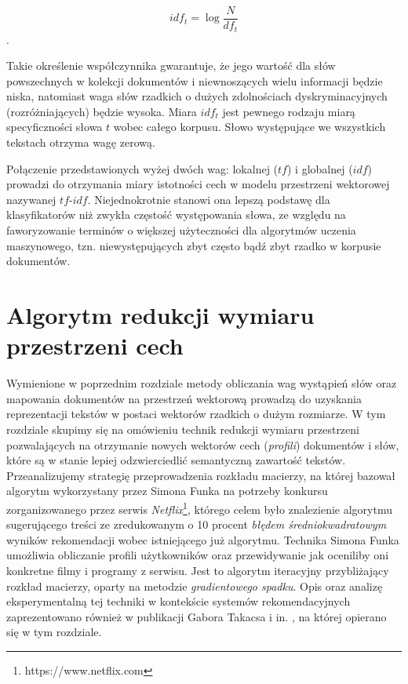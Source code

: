 \documentclass{pracamgr}
\begin{document}
\[ 
idf_t = \log\frac{N}{df_t}
\].

Takie określenie współczynnika gwarantuje, że jego wartość dla słów powszechnych w kolekcji dokumentów i niewnoszących wielu informacji będzie niska, natomiast waga słów rzadkich o dużych zdolnościach dyskryminacyjnych (rozróżniających) będzie wysoka. Miara $idf_t$ jest pewnego rodzaju miarą specyficzności słowa $t$ wobec całego korpusu. Słowo występujące we wszystkich tekstach otrzyma wagę zerową. 

Połączenie przedstawionych wyżej dwóch wag: lokalnej ($tf$) i globalnej ($idf$) prowadzi do otrzymania miary istotności cech w modelu przestrzeni wektorowej nazywanej $tf \text{-} idf$. Niejednokrotnie stanowi ona lepszą podstawę dla klasyfikatorów niż zwykła częstość występowania słowa, ze względu na faworyzowanie terminów o większej użyteczności dla algorytmów uczenia maszynowego, tzn. niewystępujących zbyt często bądź zbyt rzadko w korpusie dokumentów.

\chapter{Algorytm redukcji wymiaru przestrzeni cech}

Wymienione w poprzednim rozdziale metody obliczania wag wystąpień słów oraz mapowania dokumentów na przestrzeń wektorową prowadzą do uzyskania reprezentacji tekstów w postaci wektorów rzadkich o dużym rozmiarze. W tym rozdziale skupimy się na omówieniu technik redukcji wymiaru przestrzeni pozwalających na otrzymanie nowych wektorów cech (\textit{profili}) dokumentów i słów, które są w stanie lepiej odzwierciedlić semantyczną zawartość tekstów. Przeanalizujemy strategię przeprowadzenia rozkładu macierzy, na której bazował algorytm wykorzystany przez Simona Funka \cite{funk} na potrzeby konkursu zorganizowanego przez serwis \textit{Netflix}\footnote{https://www.netflix.com}, którego celem było znalezienie algorytmu sugerującego treści ze zredukowanym o 10 procent \textit{błędem średniokwadratowym} wyników rekomendacji wobec istniejącego już algorytmu. Technika Simona Funka umożliwia obliczanie profili użytkowników oraz przewidywanie jak oceniliby oni konkretne filmy i programy z serwisu. Jest to algorytm iteracyjny przybliżający rozkład macierzy, oparty na metodzie \textit{gradientowego spadku}. Opis oraz analizę eksperymentalną tej techniki w kontekście systemów rekomendacyjnych zaprezentowano również w publikacji Gabora Takacsa i in. \cite{takacs}, na której opierano się w tym rozdziale.
\end{document}

